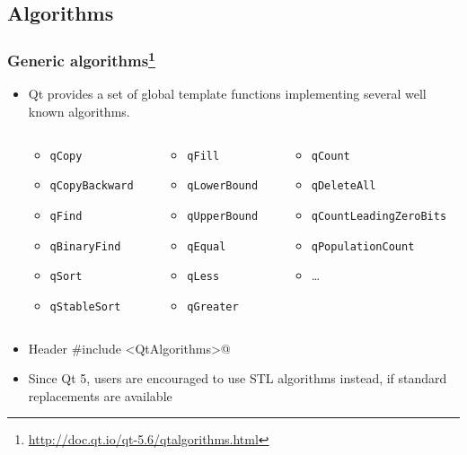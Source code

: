 \subsection{Algorithms}

\begin{frame}[fragile]
  \frametitle{Generic algorithms\footnote
    {\url{http://doc.qt.io/qt-5.6/qtalgorithms.html}}}
  \small
  \begin{itemize}
  \item Qt provides a set of global template functions implementing several
    well known algorithms.
  \begin{columns}
    \scriptsize
    \begin{column}{0.26\textwidth}
    \begin{itemize}
      \item \texttt{qCopy}
      \item \texttt{qCopyBackward}
      \item \texttt{qFind}
      \item \texttt{qBinaryFind}
      \item \texttt{qSort}
      \item \texttt{qStableSort}
    \end{itemize}
    \end{column}
    \begin{column}{0.29\textheight}
    \begin{itemize}
      \item \texttt{qFill}
      \item \texttt{qLowerBound}
      \item \texttt{qUpperBound}
      \item \texttt{qEqual}
      \item \texttt{qLess}
      \item \texttt{qGreater}
    \end{itemize}
    \end{column}
    \begin{column}{0.46\textheight}
    \begin{itemize}
      \item \texttt{qCount}
      \item \texttt{qDeleteAll}
      \item \texttt{qCountLeadingZeroBits}
      \item \texttt{qPopulationCount}
      \item \ldots
    \end{itemize}
    \end{column}
  \end{columns}

  \item Header \verb@#include <QtAlgorithms>@
  \item Since Qt 5, users are encouraged to use STL algorithms instead, if
    standard replacements are available
  \end{itemize}
\end{frame}

